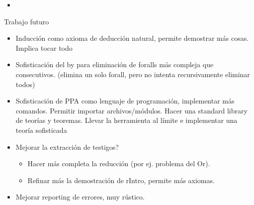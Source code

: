 \begin{itemize}
    \item {}
\end{itemize}

Trabajo futuro

\begin{itemize}
    \item Inducción como axioma de deducción natural, permite demostrar más
    cosas. Implica tocar todo
    \item Sofisticación del by para eliminación de foralls más compleja que
    consecutivos. (elimina un solo forall, pero no intenta recursivamente
    eliminar todos)
    \item Sofisticación de PPA como lenguaje de programación, implementar más
    comandos. Permitir importar archivos/módulos. Hacer una standard library
    de teorías y teoremas. Llevar la herramienta al límite e implementar una
    teoría sofisticada
    \item Mejorar la extracción de testigos?
    \begin{itemize}
        \item Hacer más completa la reducción (por ej. problema del Or).
        \item Refinar más la demostración de rIntro, permite más axiomas.
    \end{itemize}
    \item Mejorar reporting de errores, muy rústico.
\end{itemize}